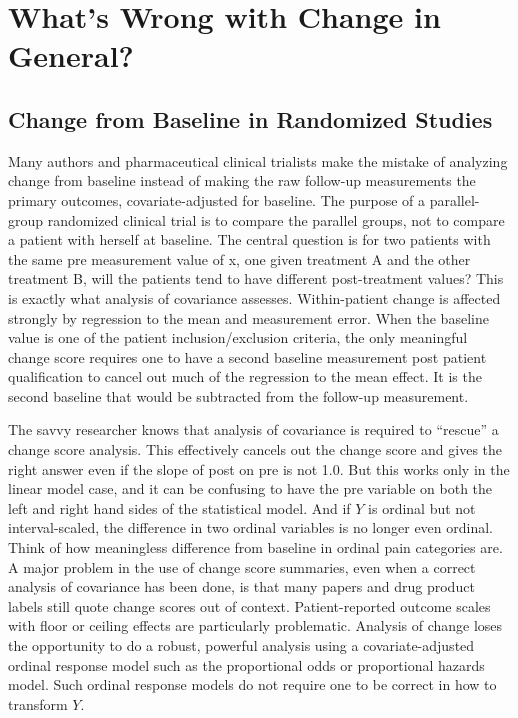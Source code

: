 \section{What's Wrong with Change in General?}
\subsection{Change from Baseline in Randomized Studies}
Many authors and pharmaceutical clinical trialists make the mistake of analyzing change from baseline instead of making the raw follow-up measurements the primary outcomes, covariate-adjusted for baseline.  The purpose of a parallel-group randomized clinical trial is to compare the parallel groups, not to compare a patient with herself at baseline. The central question is for two patients with the same pre measurement value of x, one given treatment A and the other treatment B, will the patients tend to have different post-treatment values? This is exactly what analysis of covariance assesses.  Within-patient change is affected strongly by regression to the mean and measurement error.  When the baseline value is one of the patient inclusion/exclusion criteria, the only meaningful change score requires one to have a second baseline measurement post patient qualification to cancel out much of the regression to the mean effect.  It is the second baseline that would be subtracted from the follow-up measurement.

The savvy researcher knows that analysis of covariance is required to ``rescue'' a change score analysis. This effectively cancels out the change score and gives the right answer even if the slope of post on pre is not 1.0. But this works only in the linear model case, and it can be confusing to have the pre variable on both the left and right hand sides of the statistical model. And if $Y$ is ordinal but not interval-scaled, the difference in two ordinal variables is no longer even ordinal.  Think of how meaningless difference from baseline in ordinal pain categories are. A major problem in the use of change score summaries, even when a correct analysis of covariance has been done, is that many papers and drug product labels still quote change scores out of context.  Patient-reported outcome scales with floor or ceiling effects are particularly problematic.  Analysis of change loses the opportunity to do a robust, powerful analysis using a covariate-adjusted ordinal response model such as the proportional odds or proportional hazards model.  Such ordinal response models do not require one to be correct in how to transform $Y$.


